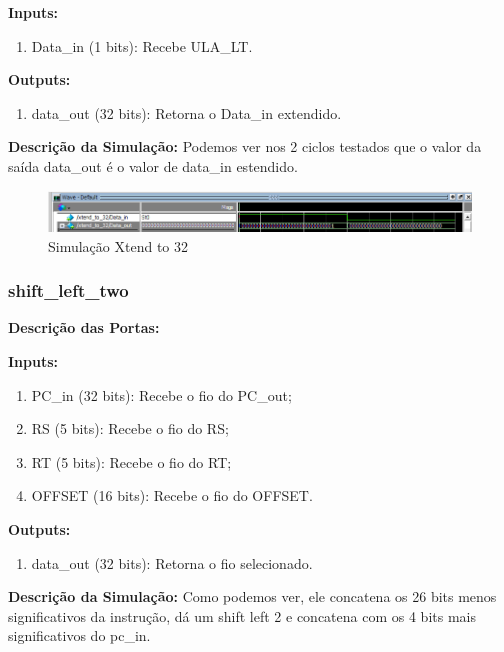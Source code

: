\textbf{Inputs:}

\begin{enumerate}
    \item Data\_in (1 bits): Recebe ULA\_LT.
\end{enumerate}

\textbf{Outputs:}

\begin{enumerate}
    \item data\_out (32 bits): Retorna o Data\_in extendido.
\end{enumerate}

\textbf{Descrição da Simulação:} Podemos ver nos 2 ciclos testados que o valor da saída data\_out é o valor de data\_in estendido.

\begin{figure}[htbp!]
\centering
\includegraphics[width=1\textwidth]{figure/simulacao_xtend_to_32.png}
\caption{Simulação Xtend to 32} 
\label{fig:imagem_massa}
\end{figure}

\subsubsection{shift\_left\_two}
\textbf{Descrição das Portas:}

\textbf{Inputs:}

\begin{enumerate}
    \item PC\_in (32 bits): Recebe o fio do PC\_out;
    \item RS (5 bits): Recebe o fio do RS;
    \item RT (5 bits): Recebe o fio do RT;
    \item OFFSET (16 bits): Recebe o fio do OFFSET.

\end{enumerate}

\textbf{Outputs:}

\begin{enumerate}
    \item data\_out (32 bits): Retorna o fio selecionado.
\end{enumerate}

\textbf{Descrição da Simulação:} Como podemos ver, ele concatena os 26 bits menos significativos da instrução, dá um shift left 2 e concatena com os 4 bits mais significativos do pc\_in.

